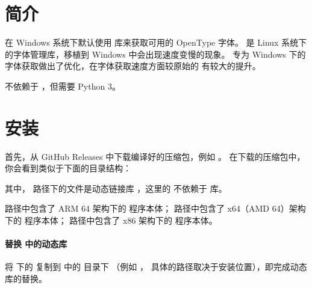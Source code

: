\documentclass[letterpaper]{article}
\title{\color{titlecolor}\xetexspecimen}
\author{Clerk Ma \\ 文档作者：AlphaZTX}
\date{2022-10-15}
\begin{document}
\maketitle
\thispagestyle{empty}

\section*{简介}
\xetex{} 在 Windows 系统下默认使用  库来获取可用的 OpenType 字体。
 是 Linux 系统下的字体管理库，移植到 Windows 中会出现速度变慢的现象。
\xetexspecimen{} 专为 Windows 下的字体获取做出了优化，在字体获取速度方面较原始的 
\xetex{} 有较大的提升。

\xetexspecimen{} 不依赖于 ，但需要 Python 3。

\begingroup\parskip0pt\relax
\tableofcontents\endgroup

\section{安装 \xetexspecimen}
首先，从 %
{GitHub Releases} 中下载编译好的压缩包，例如 。
在下载的压缩包中，你会看到类似于下面的目录结构：
其中， 路径下的文件是动态链接库 ，这里的 
 不依赖于  库。

 路径中包含了 ARM 64 架构下的 \xetex{} 程序本体；
 路径中包含了 x64（AMD 64）架构下的 \xetex{} 程序本体；
 路径中包含了 x86 架构下的 \xetex{} 程序本体。

\paragraph{替换 \texlive{} 中的动态库}
将  下的  复制到 \texlive{} 中的  目录下
（例如 ，
具体的路径取决于安装位置），即完成动态库的替换。
\end{document}
